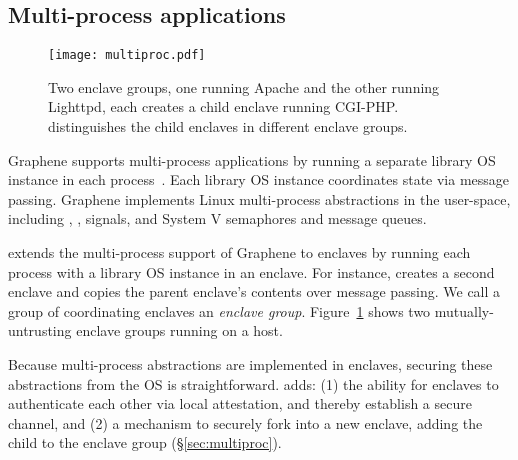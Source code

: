 \subsection{Multi-process applications}

\begin{figure}[t!]
\centering
\texttt{[image: multiproc.pdf]}
\caption{Two enclave groups, one running Apache and the other running Lighttpd, each creates a child enclave running CGI-PHP.
\graphenesgx{} distinguishes the child enclaves in different enclave groups.}
\label{fig:multiproc-threats}
\end{figure}

Graphene supports multi-process applications by running
a separate library OS instance in each process~\cite{tsai14graphene}.
Each library OS instance coordinates state via message passing.
Graphene implements Linux multi-process abstractions in the user-space, including , , signals, and System V semaphores and message queues.

\graphenesgx{} extends the multi-process support of Graphene to enclaves by running each
process with a library OS instance in an enclave.
For instance,  creates a second enclave
and copies the parent enclave's contents over message passing.
We call a group of coordinating enclaves an \emph{enclave group}.
Figure~\ref{fig:multiproc-threats} shows two mutually-untrusting enclave groups running on a host.


Because multi-process abstractions are implemented in enclaves,
securing these abstractions from the OS is straightforward. 
\graphenesgx{} adds: %
(1) the ability for enclaves to authenticate each other via local attestation,
and thereby establish a secure channel,
and (2) a mechanism to securely fork into a new enclave, adding the child to the enclave group (\S\ref{sec:multiproc}).


